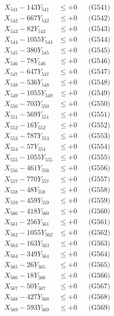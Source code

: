 \documentclass[a4paper,10pt]{article}
\begin{document}
{\begin{align}
\allowbreak
X_{541} - 143Y_{541} &\leq +0 && \text{(G541)} \\
X_{542} - 667Y_{542} &\leq +0 && \text{(G542)} \\
X_{543} - 82Y_{543} &\leq +0 && \text{(G543)} \\
X_{544} - 1055Y_{544} &\leq +0 && \text{(G544)} \\
X_{545} - 380Y_{545} &\leq +0 && \text{(G545)} \\
X_{546} - 78Y_{546} &\leq +0 && \text{(G546)} \\
X_{547} - 647Y_{547} &\leq +0 && \text{(G547)} \\
X_{548} - 536Y_{548} &\leq +0 && \text{(G548)} \\
X_{549} - 1055Y_{549} &\leq +0 && \text{(G549)} \\
X_{550} - 703Y_{550} &\leq +0 && \text{(G550)} \\
\allowbreak
X_{551} - 569Y_{551} &\leq +0 && \text{(G551)} \\
X_{552} - 16Y_{552} &\leq +0 && \text{(G552)} \\
X_{553} - 787Y_{553} &\leq +0 && \text{(G553)} \\
X_{554} - 57Y_{554} &\leq +0 && \text{(G554)} \\
X_{555} - 1055Y_{555} &\leq +0 && \text{(G555)} \\
X_{556} - 461Y_{556} &\leq +0 && \text{(G556)} \\
X_{557} - 770Y_{557} &\leq +0 && \text{(G557)} \\
X_{558} - 48Y_{558} &\leq +0 && \text{(G558)} \\
X_{559} - 459Y_{559} &\leq +0 && \text{(G559)} \\
X_{560} - 418Y_{560} &\leq +0 && \text{(G560)} \\
\allowbreak
X_{561} - 256Y_{561} &\leq +0 && \text{(G561)} \\
X_{562} - 1055Y_{562} &\leq +0 && \text{(G562)} \\
X_{563} - 163Y_{563} &\leq +0 && \text{(G563)} \\
X_{564} - 349Y_{564} &\leq +0 && \text{(G564)} \\
X_{565} - 26Y_{565} &\leq +0 && \text{(G565)} \\
X_{566} - 18Y_{566} &\leq +0 && \text{(G566)} \\
X_{567} - 50Y_{567} &\leq +0 && \text{(G567)} \\
X_{568} - 427Y_{568} &\leq +0 && \text{(G568)} \\
X_{569} - 593Y_{569} &\leq +0 && \text{(G569)} \\

\end{align}}
\end{document}
